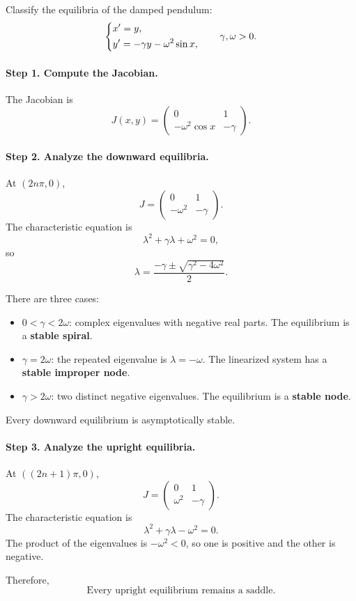 \documentclass[11pt,letterpaper]{article}
\begin{document}
\begin{example}[3]{
Classify the equilibria of the damped pendulum:
\[
\begin{dcases}
x'=y,\\
y'=-\gamma y-\omega^2\sin x,
\end{dcases}
\qquad \gamma,\omega>0.
\]
}

\paragraph{Step 1. Compute the Jacobian.}
The Jacobian is
\[
J(x,y)=
\begin{pmatrix}
0&1\\
-\omega^2\cos x&-\gamma
\end{pmatrix}.
\]

\paragraph{Step 2. Analyze the downward equilibria.}
At $(2n\pi,0)$,
\[
J=
\begin{pmatrix}
0&1\\
-\omega^2&-\gamma
\end{pmatrix}.
\]
The characteristic equation is
\[
\lambda^2+\gamma\lambda+\omega^2=0,
\]
so
\[
\lambda=
\frac{-\gamma\pm\sqrt{\gamma^2-4\omega^2}}{2}.
\]

There are three cases:
\begin{itemize}
    \item $0<\gamma<2\omega$:
    complex eigenvalues with negative real parts.
    The equilibrium is a \textbf{stable spiral}.

    \item $\gamma=2\omega$:
    the repeated eigenvalue is $\lambda=-\omega$.
    The linearized system has a
    \textbf{stable improper node}.

    \item $\gamma>2\omega$:
    two distinct negative eigenvalues.
    The equilibrium is a \textbf{stable node}.
\end{itemize}
Every downward equilibrium is asymptotically stable.

\paragraph{Step 3. Analyze the upright equilibria.}
At $((2n+1)\pi,0)$,
\[
J=
\begin{pmatrix}
0&1\\
\omega^2&-\gamma
\end{pmatrix}.
\]
The characteristic equation is
\[
\lambda^2+\gamma\lambda-\omega^2=0.
\]
The product of the eigenvalues is $-\omega^2<0$,
so one is positive and the other is negative.

Therefore,
\[
\boxed{\text{Every upright equilibrium remains a saddle}.}
\]
\end{example}
\end{document}
